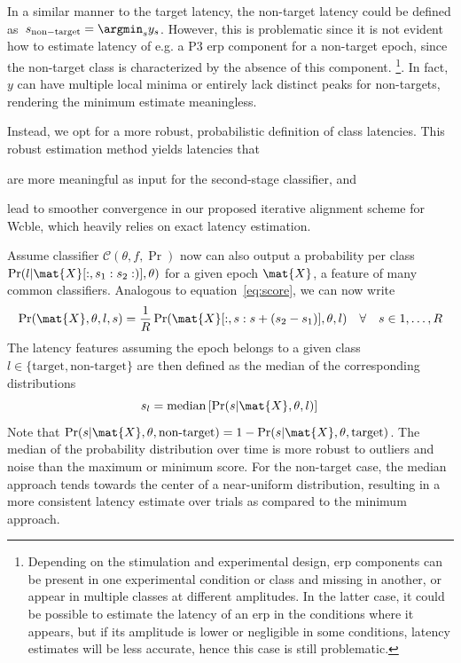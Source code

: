 In a similar manner to the target latency, the non-target latency could be defined
as~$s_\mathrm{non-target}=\argmin_s{y_s}$.
However, this is problematic since it is not evident how to estimate
latency of e.g. a P3 \ac{erp} component for a non-target epoch, since the
non-target class is characterized by the absence of this component.
\footnote{Depending on the stimulation and experimental design, \ac{erp} components can be present in one experimental
	condition or class and missing in another, or appear in multiple classes
	at different amplitudes. In the latter case, it could be possible
	to estimate the latency of an \ac{erp} in the conditions where it appears, but if
	its amplitude is lower or negligible in some conditions, latency estimates
	will be less accurate, hence this case is still problematic.}.
In fact, $y$ can have multiple local minima or entirely lack distinct peaks for
non-targets, rendering the minimum estimate meaningless.

Instead, we opt for a more robust, probabilistic definition of class latencies.
This robust estimation method yields latencies that
\begin{enumerate*}[label=(\arabic*)]
  \item are more meaningful as input for the second-stage
    classifier, and
  \item lead to smoother convergence in our proposed iterative alignment scheme
    for W\ac{cble}, which heavily relies on exact latency estimation.
\end{enumerate*}
Assume classifier $\mathcal{C}(\theta,f,\Pr)$ now can also output a probability
per class $\Pr(l|
\mat{X}[:,s_1:s_2:)], \theta)$ for a given epoch $\mat{X}$, a feature of many
common classifiers.
Analogous to equation~\ref{eq:score}, we can now write
\begin{equation}
\Pr(\mat{X},\theta,l,s) = \frac{1}{R}\Pr(\mat{X}[:,s:s+(s_2-s_1)],\theta,l)
  \quad \forall \quad s\in 1,\ldots,R
	\label{eq:prob}
\end{equation}
The latency features assuming the epoch belongs to a given class
$l\in\{\textrm{target},\textrm{non-target}\}$ are then defined as the median of
the corresponding  distributions
\begin{equation}
  s_l =\mathrm{median}\left[\Pr(s|\mat{X},\theta,l) \right] \\
  \label{eq:prob-latency}
\end{equation}
Note that $  \Pr(s|\mat{X},\theta,\textrm{non-target}) =1-
  \Pr(s|\mat{X},\theta,\mathrm{target})$.
The median of the probability distribution over time is more robust to
outliers and noise than the maximum or minimum score.
For the non-target case, the median approach tends towards the center of a
near-uniform distribution, resulting in a more consistent latency estimate over
trials as compared to the minimum approach.

